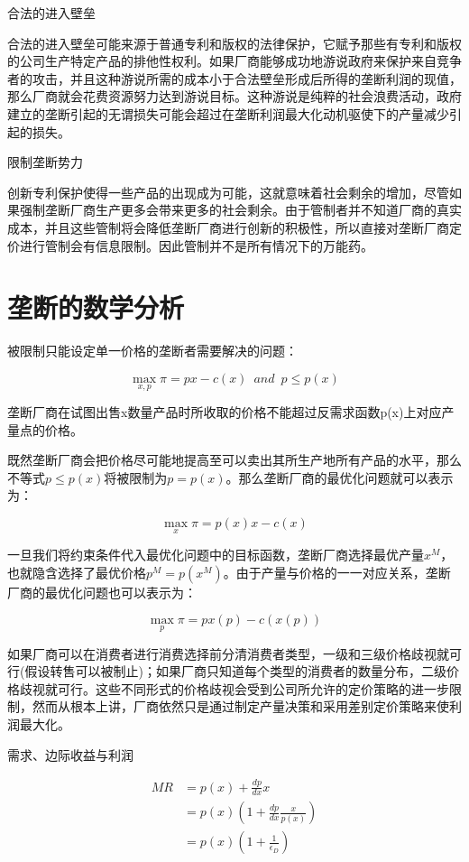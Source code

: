 \documentclass{article}
\begin{document}
\hspace*{\fill}

合法的进入壁垒

合法的进入壁垒可能来源于普通专利和版权的法律保护，它赋予那些有专利和版权的公司生产特定产品的排他性权利。如果厂商能够成功地游说政府来保护来自竞争者的攻击，并且这种游说所需的成本小于合法壁垒形成后所得的垄断利润的现值，那么厂商就会花费资源努力达到游说目标。这种游说是纯粹的社会浪费活动，政府建立的垄断引起的无谓损失可能会超过在垄断利润最大化动机驱使下的产量减少引起的损失。


\hspace*{\fill}

限制垄断势力

创新专利保护使得一些产品的出现成为可能，这就意味着社会剩余的增加，尽管如果强制垄断厂商生产更多会带来更多的社会剩余。由于管制者并不知道厂商的真实成本，并且这些管制将会降低垄断厂商进行创新的积极性，所以直接对垄断厂商定价进行管制会有信息限制。因此管制并不是所有情况下的万能药。

\section{垄断的数学分析}

被限制只能设定单一价格的垄断者需要解决的问题：

\[
\max\limits_{x,p}\pi=px-c(x)\enspace and\enspace p\le p(x)
\]

垄断厂商在试图出售x数量产品时所收取的价格不能超过反需求函数p(x)上对应产量点的价格。

既然垄断厂商会把价格尽可能地提高至可以卖出其所生产地所有产品的水平，那么不等式$ p\le p(x) $将被限制为$ p=p(x) $。那么垄断厂商的最优化问题就可以表示为：

\[
\max\limits_{x} \pi=p(x)x-c(x)
\]

一旦我们将约束条件代入最优化问题中的目标函数，垄断厂商选择最优产量$ x^M $，也就隐含选择了最优价格$ p^M=p(x^M) $。由于产量与价格的一一对应关系，垄断厂商的最优化问题也可以表示为：

\[
\max\limits_{p} \pi=px(p)-c(x(p))
\]

如果厂商可以在消费者进行消费选择前分清消费者类型，一级和三级价格歧视就可行(假设转售可以被制止)；如果厂商只知道每个类型的消费者的数量分布，二级价格歧视就可行。这些不同形式的价格歧视会受到公司所允许的定价策略的进一步限制，然而从根本上讲，厂商依然只是通过制定产量决策和采用差别定价策略来使利润最大化。

需求、边际收益与利润

\begin{equation*}
	\begin{split}
	MR&=p(x)+\frac{dp}{dx}x\\
	&=p(x)(1+\frac{dp}{dx}\frac{x}{p(x)})\\
	&=p(x)(1+\frac{1}{\epsilon_D})
	\end{split}
\end{equation*}
\end{document}
